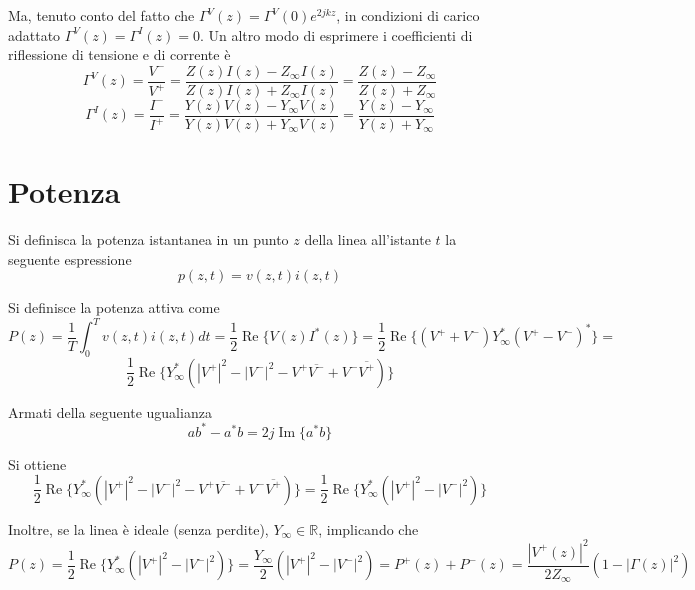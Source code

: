     Ma, tenuto conto del fatto che $\Gamma^V(z) = \Gamma^V(0) e^{2jkz}$, in condizioni di carico adattato $\Gamma^V(z) = \Gamma^I(z) = 0$.
    Un altro modo di esprimere i coefficienti di riflessione di tensione e di corrente è
    \[
        \Gamma^V(z) = \frac{V^-}{V^+} = \frac{Z(z)I(z) - Z_\infty I(z)}{Z(z)I(z) + Z_\infty I(z)} = \frac{Z(z) - Z_\infty}{Z(z) + Z_\infty}
    \]
    \[
        \Gamma^I(z) = \frac{I^-}{I^+} = \frac{Y(z)V(z) - Y_\infty V(z)}{Y(z)V(z) + Y_\infty V(z)} = \frac{Y(z) - Y_\infty}{Y(z) + Y_\infty}
    \]


\section{Potenza}
    Si definisca la potenza istantanea in un punto $z$ della linea all'istante $t$ la seguente espressione
    \[
        p(z, t) = v(z, t) i(z, t)
    \]

    Si definisce la potenza attiva come
    \[
        P(z) = \frac{1}{T} \int_{0}^{T} v(z, t) i(z, t) dt = 
        \frac{1}{2} \operatorname{Re}\{{V(z) I^*(z)}\} = 
        \frac{1}{2} \operatorname{Re}\{{(V^+ + V^-) Y_\infty^* (V^+ - V^-)^*}\} =
    \]
    \[
        \frac{1}{2} \operatorname{Re}\{{Y_\infty^* (|V^+|^2 - |V^-|^2 - V^+ \overline{V^{-}} + V^- \overline{V^+})}\}
    \] 

    Armati della seguente ugualianza
    \[
        a b^* - a^* b = 2j \operatorname{Im}\{a^* b\}
    \]

    Si ottiene
    \[
        \frac{1}{2} \operatorname{Re}\{{Y_\infty^* (|V^+|^2 - |V^-|^2 - V^+ \overline{V^{-}} + V^- \overline{V^+})}\} = 
        \frac{1}{2} \operatorname{Re}\{{Y_\infty^* (|V^+|^2 - |V^-|^2)}\}
    \] 

    Inoltre, se la linea è ideale (senza perdite), $Y_\infty \in \mathbb{R}$, implicando che
    \[
        P(z) = \frac{1}{2} \operatorname{Re}\{{Y_\infty^* (|V^+|^2 - |V^-|^2)}\} = 
        \frac{Y_\infty}{2} (|V^+|^2 - |V^-|^2) =
        P^+(z) + P^-(z) = 
        \frac{|V^+(z)|^2}{2 Z_\infty} (1 - |\Gamma(z)|^2)
    \]